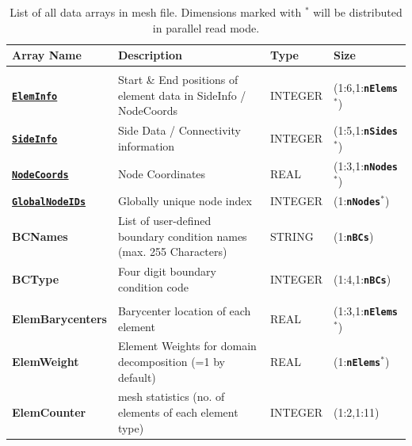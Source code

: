\documentclass[a4paper,headsepline]{scrreprt}
\newcommand\ttbf[1]{\texttt{\textbf{#1}}}
\newcommand\ElemInfo{\hyperlink{ElemInfo}{\ttbf{ElemInfo}}\xspace}
\newcommand\SideInfo{\hyperlink{SideInfo}{\ttbf{SideInfo}}\xspace}
\newcommand\NodeCoords{\hyperlink{NodeInfo}{\ttbf{NodeCoords}}\xspace}
\newcommand\GlobalNodeIDs{\hyperlink{NodeInfo}{\ttbf{GlobalNodeIDs}}\xspace}
\newcommand\nElems{\ttbf{nElems}\xspace}
\newcommand\nSides{\ttbf{nSides}\xspace}
\newcommand\nNodes{\ttbf{nNodes}\xspace}
\newcommand\nBCs{\ttbf{nBCs}\xspace}
\begin{document}
\begin{table}[h!]
\centering
\begin{tabularx}{1.0\textwidth}{|>{\bfseries\ttfamily}l|X|l|l|} \hline
\normalfont \textbf{Array Name}  & \textbf{Description}                         & \textbf{Type} & \textbf{Size}        \\ \hline \hline
\multicolumn{4}{|l|}{\normalfont \textit{Main information:}} \\\hline
\ElemInfo        & Start \& End positions of element data in SideInfo / NodeCoords     & INTEGER & (1:6,1:\nElems$^*$) \\\hline
\SideInfo        & Side Data / Connectivity information                    & INTEGER   & (1:5,1:\nSides$^*$)           \\\hline
\NodeCoords      & Node Coordinates                                        & REAL      & (1:3,1:\nNodes$^*$)           \\\hline
\GlobalNodeIDs   & Globally unique node index                              & INTEGER   & (1:\nNodes$^*$)           \\\hline
BCNames         & List of user-defined boundary condition names (max. 255 Characters)& STRING    & (1:\nBCs)               \\\hline
BCType          & Four digit boundary condition code                      & INTEGER   & (1:4,1:\nBCs)             \\\hline
\multicolumn{4}{|l|}{\normalfont \textit{Additional information:}} \\\hline
ElemBarycenters & Barycenter location of each element                   & REAL      & (1:3,1:\nElems$^*$)           \\\hline
ElemWeight      & Element Weights for domain decomposition (=1 by default)& REAL      & (1:\nElems$^*$)             \\\hline
ElemCounter     & mesh statistics (no. of elements of each element type)  & INTEGER   & (1:2,1:11)           \\\hline
\end{tabularx}
\caption{List of all data arrays in mesh file. Dimensions marked with $^*$ will be distributed in parallel read mode. }
\end{table}


\clearpage
\end{document}
